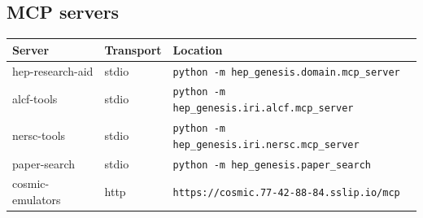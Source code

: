 \documentclass[11pt,a4paper]{article}
\begin{document}
\subsection{MCP servers}
\begin{longtable}{@{}p{}p{}p{}@{}}
\toprule Server & Transport & Location \\ \midrule \endhead
hep-research-aid & stdio & \texttt{python -m hep\_\allowbreak{}genesis.domain.mcp\_\allowbreak{}server} \\
alcf-tools & stdio & \texttt{python -m hep\_\allowbreak{}genesis.iri.alcf.mcp\_\allowbreak{}server} \\
nersc-tools & stdio & \texttt{python -m hep\_\allowbreak{}genesis.iri.nersc.mcp\_\allowbreak{}server} \\
paper-search & stdio & \texttt{python -m hep\_\allowbreak{}genesis.paper\_\allowbreak{}search} \\
cosmic-emulators & http & \texttt{https:\allowbreak{}/\allowbreak{}/\allowbreak{}cosmic.77-42-88-84.sslip.io/\allowbreak{}mcp} \\
\bottomrule\end{longtable}
\end{document}
